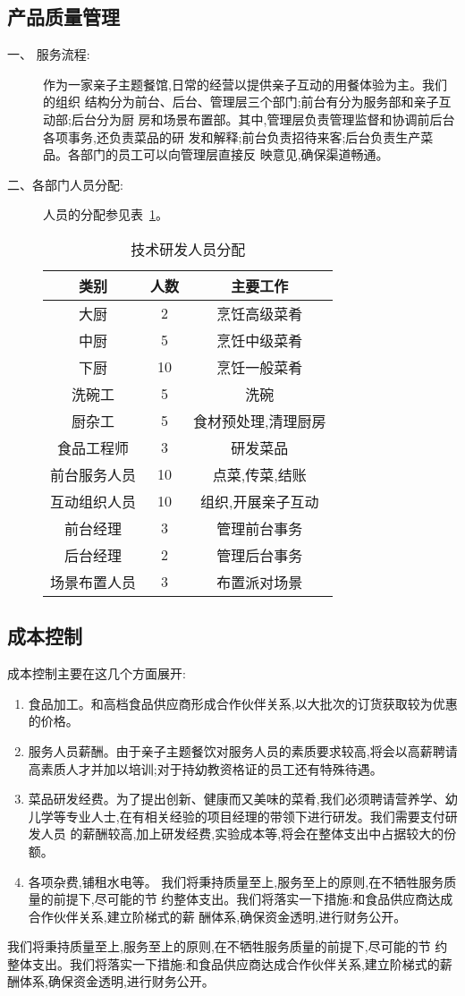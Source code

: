 \subsection{产品质量管理}
\begin{description}
\item[一、 服务流程:]
作为一家亲子主题餐馆,日常的经营以提供亲子互动的用餐体验为主。我们的组织
结构分为前台、后台、管理层三个部门;前台有分为服务部和亲子互动部;后台分为厨
房和场景布置部。其中,管理层负责管理监督和协调前后台各项事务,还负责菜品的研
发和解释;前台负责招待来客;后台负责生产菜品。各部门的员工可以向管理层直接反
映意见,确保渠道畅通。

\item[二、各部门人员分配:]
人员的分配参见表~\ref{table:人员分配}。
\begin{table}
\centering
\caption{技术研发人员分配}
\label{table:人员分配}
\begin{tabular}{|c|c|c|}
\hline
类别&人数&主要工作\\ \hline
大厨&2&烹饪高级菜肴\\ \hline
中厨&5&烹饪中级菜肴\\ \hline
下厨&10&烹饪一般菜肴\\ \hline
洗碗工&5&洗碗\\ \hline
厨杂工&5&食材预处理,清理厨房\\ \hline
食品工程师&3&研发菜品\\ \hline
前台服务人员&10&点菜,传菜,结账\\ \hline
互动组织人员&10&组织,开展亲子互动\\ \hline
前台经理&3&管理前台事务\\ \hline
后台经理&2&管理后台事务\\ \hline
场景布置人员&3&布置派对场景\\ \hline
\end{tabular}
\end{table}
\end{description}

\subsection{成本控制}
成本控制主要在这几个方面展开:
\begin{enumerate}
\item 食品加工。和高档食品供应商形成合作伙伴关系,以大批次的订货获取较为优惠
的价格。
\item 服务人员薪酬。由于亲子主题餐饮对服务人员的素质要求较高,将会以高薪聘请
高素质人才并加以培训;对于持幼教资格证的员工还有特殊待遇。
\item 菜品研发经费。为了提出创新、健康而又美味的菜肴,我们必须聘请营养学、幼
儿学等专业人士,在有相关经验的项目经理的带领下进行研发。我们需要支付研发人员
的薪酬较高,加上研发经费,实验成本等,将会在整体支出中占据较大的份额。
\item 各项杂费,铺租水电等。
我们将秉持质量至上,服务至上的原则,在不牺牲服务质量的前提下,尽可能的节
约整体支出。我们将落实一下措施:和食品供应商达成合作伙伴关系,建立阶梯式的薪
酬体系,确保资金透明,进行财务公开。
\end{enumerate}
我们将秉持质量至上,服务至上的原则,在不牺牲服务质量的前提下,尽可能的节
约整体支出。我们将落实一下措施:和食品供应商达成合作伙伴关系,建立阶梯式的薪
酬体系,确保资金透明,进行财务公开。

